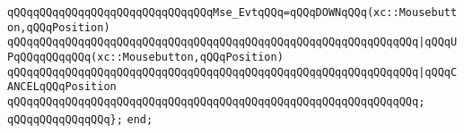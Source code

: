 \newline
\newline
\verb|qQQqqQQqqQQqqQQqqQQqqQQqqQQqqQQqMse_EvtqQQq=qQQqDOWNqQQq(xc::Mousebutton,qQQqPosition)|\newline
\verb|qQQqqQQqqQQqqQQqqQQqqQQqqQQqqQQqqQQqqQQqqQQqqQQqqQQqqQQqqQQqqQQq|\verb#|qQQqUPqQQqqQQqqQQq(xc::Mousebutton,qQQqPosition)#\newline
\verb|qQQqqQQqqQQqqQQqqQQqqQQqqQQqqQQqqQQqqQQqqQQqqQQqqQQqqQQqqQQqqQQq|\verb#|qQQqCANCELqQQqPosition#\newline
\verb|qQQqqQQqqQQqqQQqqQQqqQQqqQQqqQQqqQQqqQQqqQQqqQQqqQQqqQQqqQQqqQQq;|\newline
\newline
\verb|qQQqqQQqqQQqqQQq};|\newline
\verb|end;|\newline
\newline

